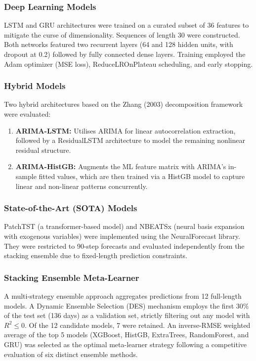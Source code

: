 \subsubsection{Deep Learning Models}
LSTM and GRU architectures were trained on a curated subset of 36 features to mitigate the curse of dimensionality. Sequences of length 30 were constructed. Both networks featured two recurrent layers (64 and 128 hidden units, with dropout at 0.2) followed by fully connected dense layers. Training employed the Adam optimizer (MSE loss), ReduceLROnPlateau scheduling, and early stopping.

\subsubsection{Hybrid Models}
Two hybrid architectures based on the Zhang (2003) decomposition framework were evaluated:
\begin{enumerate}
    \item \textbf{ARIMA-LSTM:} Utilises ARIMA for linear autocorrelation extraction, followed by a ResidualLSTM architecture to model the remaining nonlinear residual structure.
    \item \textbf{ARIMA-HistGB:} Augments the ML feature matrix with ARIMA's in-sample fitted values, which are then trained via a HistGB model to capture linear and non-linear patterns concurrently.
\end{enumerate}

\subsubsection{State-of-the-Art (SOTA) Models}
PatchTST (a transformer-based model) and NBEATSx (neural basis expansion with exogenous variables) were implemented using the NeuralForecast library. They were restricted to 90-step forecasts and evaluated independently from the stacking ensemble due to fixed-length prediction constraints.

\subsubsection{Stacking Ensemble Meta-Learner}
A multi-strategy ensemble approach aggregates predictions from 12 full-length models. A Dynamic Ensemble Selection (DES) mechanism employs the first 30\% of the test set (136 days) as a validation set, strictly filtering out any model with $R^2 \leq 0$. Of the 12 candidate models, 7 were retained. An inverse-RMSE weighted average of the top 5 models (XGBoost, HistGB, ExtraTrees, RandomForest, and GRU) was selected as the optimal meta-learner strategy following a competitive evaluation of six distinct ensemble methods.
